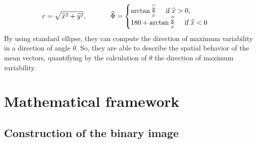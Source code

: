 \documentclass[12pt]{article}
\renewcommand{\hat}{\widehat}
\theoremstyle{Theorem}
\theoremstyle{definition}
\begin{document}
{\begin{equation*}
\end{equation*}
\begin{equation*}
r=\sqrt{\hat{x}^{2} + \hat{y}^{2}}, \; \hspace{1cm} \; \hat{\Phi} = \begin{cases} \arctan{\frac{\hat{y}}{\hat{x}}} \hspace{0.5cm} \text{if} \; \hat{x} > 0 , \\
180 + \arctan{\frac{\hat{y}}{\hat{x}}} \hspace{0.5cm} \text{if} \; \hat{x} < 0 
\end{cases}
\end{equation*}
By using standard ellipse, they can compute the direction of maximum variability in a direction of angle $\theta$. So, they are able to describe the spatial behavior of the mean vectors, quantifying by the calculation of $\theta$ the direction of maximum variability.
} 

\section{Mathematical framework}\label{section1}
\subsection{Construction of the binary image}\label{construction}
\end{document}
